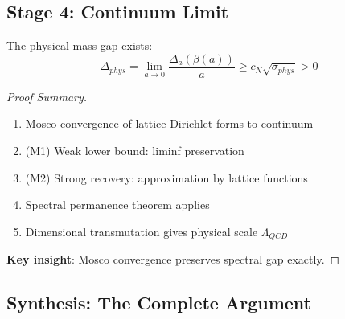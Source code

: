 \subsection{Stage 4: Continuum Limit}

\begin{theorem}
\label{thm:stage4}
The physical mass gap exists:
\begin{equation}
\Delta_{phys} = \lim_{a \to 0} \frac{\Delta_a(\beta(a))}{a} \geq c_N \sqrt{\sigma_{phys}} > 0
\end{equation}
\end{theorem}

\begin{proof}[Proof Summary]
\begin{enumerate}
\item Mosco convergence of lattice Dirichlet forms to continuum
\item (M1) Weak lower bound: liminf preservation
\item (M2) Strong recovery: approximation by lattice functions
\item Spectral permanence theorem applies
\item Dimensional transmutation gives physical scale $\Lambda_{QCD}$
\end{enumerate}

\textbf{Key insight}: Mosco convergence preserves spectral gap exactly.
\end{proof}

\subsection{Synthesis: The Complete Argument}

